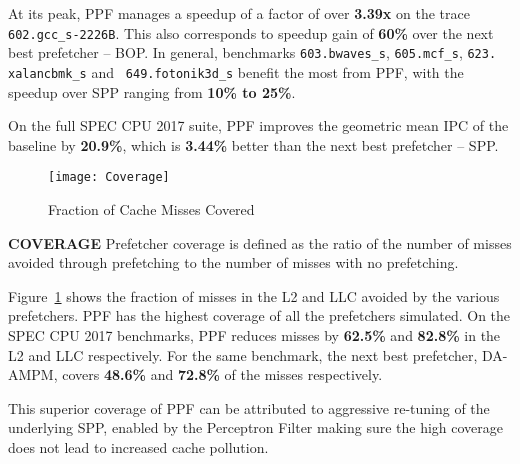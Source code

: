 At its peak, PPF manages a speedup of a factor of over \textbf{3.39x} on the
trace {\tt 602.gcc\_s-2226B}. This also corresponds to speedup gain of
\textbf{60\%} over the next best prefetcher -- BOP. In general, benchmarks
{\tt 603.bwaves\_s}, {\tt 605.mcf\_s}, {\tt 623. xalancbmk\_s} and {\tt
649.fotonik3d\_s} benefit the most from PPF, with the speedup over SPP ranging
from \textbf{10\% to 25\%}.

On the full SPEC CPU 2017 suite, PPF improves the geometric mean IPC of 
the baseline by \textbf{20.9\%}, which is \textbf{3.44\%} better 
than the next best prefetcher -- SPP.
\newline

\begin{figure}[h]
\texttt{[image: Coverage]}
\caption{Fraction of Cache Misses Covered}
\label{Fig:Coverage}
\end{figure}


\noindent \textbf{COVERAGE}
\newline
Prefetcher coverage is defined as the ratio of the number of misses avoided
through prefetching to the number of misses with no prefetching.

Figure~\ref{Fig:Coverage} shows the fraction of misses in the L2 and LLC
avoided by the various prefetchers. PPF has the highest coverage of all the
prefetchers simulated. On the SPEC CPU 2017 benchmarks, PPF reduces misses by
\textbf{62.5\%} and \textbf{82.8\%} in the L2 and LLC respectively. For the
same benchmark, the next best prefetcher, DA-AMPM, covers \textbf{48.6\%} and
\textbf{72.8\%} of the misses respectively.

This superior coverage of PPF can be attributed to aggressive re-tuning of the
underlying SPP, enabled by the Perceptron Filter making sure the high coverage
does not lead to increased cache pollution.


